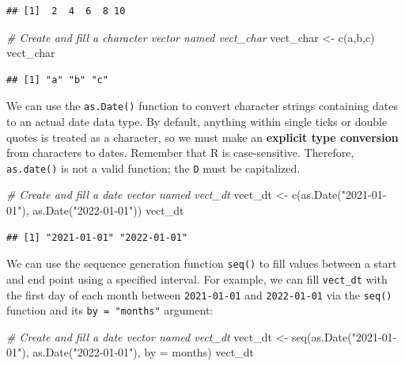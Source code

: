 \documentclass[
]{book}
\newenvironment{Shaded}{\begin{snugshade}}{\end{snugshade}}
\newcommand{\AttributeTok}[1]{\textcolor[rgb]{0.77,0.63,0.00}{#1}}
\newcommand{\CommentTok}[1]{\textcolor[rgb]{0.56,0.35,0.01}{\textit{#1}}}
\newcommand{\FunctionTok}[1]{\textcolor[rgb]{0.00,0.00,0.00}{#1}}
\newcommand{\NormalTok}[1]{#1}
\newcommand{\OtherTok}[1]{\textcolor[rgb]{0.56,0.35,0.01}{#1}}
\newcommand{\StringTok}[1]{\textcolor[rgb]{0.31,0.60,0.02}{#1}}
\begin{document}
\begin{verbatim}
## [1]  2  4  6  8 10
\end{verbatim}

\begin{Shaded}
\begin{Highlighting}[]
\CommentTok{\# Create and fill a character vector named vect\_char}
\NormalTok{vect\_char }\OtherTok{\textless{}{-}} \FunctionTok{c}\NormalTok{(}\StringTok{\textquotesingle{}a\textquotesingle{}}\NormalTok{,}\StringTok{\textquotesingle{}b\textquotesingle{}}\NormalTok{,}\StringTok{\textquotesingle{}c\textquotesingle{}}\NormalTok{)}
\NormalTok{vect\_char}
\end{Highlighting}
\end{Shaded}

\begin{verbatim}
## [1] "a" "b" "c"
\end{verbatim}

We can use the \texttt{as.Date()} function to convert character strings containing dates to an actual date data type. By default, anything within single ticks or double quotes is treated as a character, so we must make an \textbf{explicit type conversion} from characters to dates. Remember that R is case-sensitive. Therefore, \texttt{as.date()} is not a valid function; the \texttt{D} must be capitalized.

\begin{Shaded}
\begin{Highlighting}[]
\CommentTok{\# Create and fill a date vector named vect\_dt}
\NormalTok{vect\_dt }\OtherTok{\textless{}{-}} \FunctionTok{c}\NormalTok{(}\FunctionTok{as.Date}\NormalTok{(}\StringTok{"2021{-}01{-}01"}\NormalTok{), }\FunctionTok{as.Date}\NormalTok{(}\StringTok{"2022{-}01{-}01"}\NormalTok{))}
\NormalTok{vect\_dt}
\end{Highlighting}
\end{Shaded}

\begin{verbatim}
## [1] "2021-01-01" "2022-01-01"
\end{verbatim}

We can use the sequence generation function \texttt{seq()} to fill values between a start and end point using a specified interval. For example, we can fill \texttt{vect\_dt} with the first day of each month between \texttt{2021-01-01} and \texttt{2022-01-01} via the \texttt{seq()} function and its \texttt{by\ =\ "months"} argument:

\begin{Shaded}
\begin{Highlighting}[]
\CommentTok{\# Create and fill a date vector named vect\_dt}
\NormalTok{vect\_dt }\OtherTok{\textless{}{-}} \FunctionTok{seq}\NormalTok{(}\FunctionTok{as.Date}\NormalTok{(}\StringTok{"2021{-}01{-}01"}\NormalTok{), }\FunctionTok{as.Date}\NormalTok{(}\StringTok{"2022{-}01{-}01"}\NormalTok{), }\AttributeTok{by =} \StringTok{\textquotesingle{}months\textquotesingle{}}\NormalTok{)}
\NormalTok{vect\_dt}
\end{Highlighting}
\end{Shaded}
\end{document}
